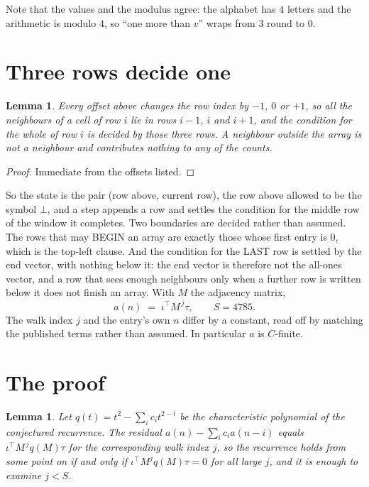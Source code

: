 \documentclass[11pt,a4paper]{article}
\theoremstyle{plain}
\newtheorem{lemma}[theorem]{Lemma}
\theoremstyle{definition}
\begin{document}
Note that the values and the modulus agree: the alphabet has $4$ letters and the arithmetic
is modulo $4$, so ``one more than $v$'' wraps from $3$ round to $0$.

\section{Three rows decide one}

\begin{lemma}\label{lem:win}
Every offset above changes the row index by $-1$, $0$ or $+1$, so all the neighbours of a cell
of row $i$ lie in rows $i-1$, $i$ and $i+1$, and the condition for the whole of row $i$ is
decided by those three rows. A neighbour outside the array is not a neighbour and contributes
nothing to any of the counts.
\end{lemma}

\begin{proof}
Immediate from the offsets listed.
\end{proof}

So the state is the pair (row above, current row), the row above allowed to be the symbol
$\bot$, and a step appends a row and settles the condition for the middle row of the window it
completes. Two boundaries are decided rather than assumed. The rows that may BEGIN an array are
exactly those whose first entry is $0$, which is the top-left clause. And the condition for the
LAST row is settled by the end vector, with nothing below it: the end vector is therefore not
the all-ones vector, and a row that sees enough neighbours only when a further row is written
below it does not finish an array. With $M$ the adjacency matrix,
\[
a(n)\;=\;\iota^{\!\top}M^{\,j}\tau ,\qquad S=4785.
\]
The walk index $j$ and the entry's own $n$ differ by a constant, read off by matching the
published terms rather than assumed. In particular $a$ is $C$-finite.

\section{The proof}

\begin{lemma}\label{lem:crit}
Let $q(t)=t^{2}-\sum_i c_it^{2-i}$ be the characteristic polynomial of the
conjectured recurrence. The residual $a(n)-\sum_ic_ia(n-i)$ equals
$\iota^{\!\top}M^{\,j}q(M)\tau$ for the corresponding walk index $j$, so the recurrence
holds from some point on if and only if $\iota^{\!\top}M^{j}q(M)\tau=0$ for all large $j$,
and it is enough to examine $j<S$.
\end{lemma}
\end{document}
